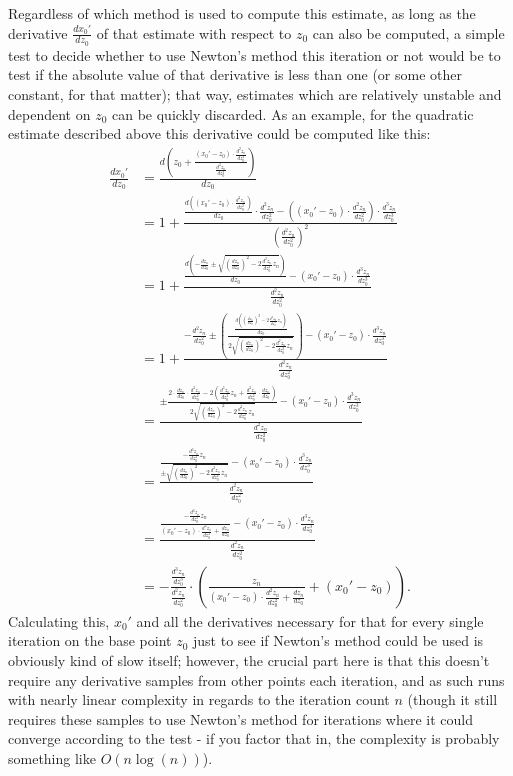 \documentclass[12pt,a4paper]{article}
\newcommand{\eqar}[1]{\begin{align*} #1 \end{align*}}
\begin{document}
Regardless of which method is used to compute this estimate, as long as the derivative $\frac{dx_0'}{dz_0}$ of that estimate with respect to $z_0$ can also be computed, a simple test to decide whether to use Newton's method this iteration or not would be to test if the absolute value of that derivative is less than one (or some other constant, for that matter); that way, estimates which are relatively unstable and dependent on $z_0$ can be quickly discarded. As an example, for the quadratic estimate described above this derivative could be computed like this:
\eqar{
	\frac{dx_0'}{dz_0} &= \frac{d\left(z_0+\frac{(x_0'-z_0)\cdot\frac{d^2z_n}{dz_0^2}}{\frac{d^2z_n}{dz_0^2}}\right)}{dz_0}\\
	&= 1+\frac{\frac{d\left((x_0'-z_0)\cdot\frac{d^2z_n}{dz_0^2}\right)}{dz_0}\cdot\frac{d^2z_n}{dz_0^2}-((x_0'-z_0)\cdot\frac{d^2z_n}{dz_0^2})\cdot\frac{d^3z_n}{dz_0^3}}{(\frac{d^2z_n}{dz_0^2})^2}\\
	&= 1+\frac{\frac{d\left(-\frac{dz_n}{dz_0}\pm\sqrt{(\frac{dz_n}{dz_0})^2-2\frac{d^2z_n}{dz_0^2}z_n}\right)}{dz_0}-(x_0'-z_0)\cdot\frac{d^3z_n}{dz_0^3}}{\frac{d^2z_n}{dz_0^2}}\\
	&= 1+\frac{-\frac{d^2z_n}{dz_0^2}\pm\left(\frac{\frac{d((\frac{dz_n}{dz_0})^2-2\frac{d^2z_n}{dz_0^2}z_n)}{dz_0}}{2\sqrt{(\frac{dz_n}{dz_0})^2-2\frac{d^2z_n}{dz_0^2}z_n}}\right)-(x_0'-z_0)\cdot\frac{d^3z_n}{dz_0^3}}{\frac{d^2z_n}{dz_0^2}}\\
	&= \frac{\pm\frac{2\cdot\frac{dz_n}{dz_0}\cdot\frac{d^2z_n}{dz_0^2}-2(\frac{d^3z_n}{dz_0^3}z_n+\frac{d^2z_n}{dz_0^2}\cdot\frac{dz_n}{dz_0})}{2\sqrt{(\frac{dz_n}{dz_0})^2-2\frac{d^2z_n}{dz_0^2}z_n}}-(x_0'-z_0)\cdot\frac{d^3z_n}{dz_0^3}}{\frac{d^2z_n}{dz_0^2}}\\
	&= \frac{\frac{-\frac{d^3z_n}{dz_0^3}z_n}{\pm\sqrt{(\frac{dz_n}{dz_0})^2-2\frac{d^2z_n}{dz_0^2}z_n}}-(x_0'-z_0)\cdot\frac{d^3z_n}{dz_0^3}}{\frac{d^2z_n}{dz_0^2}}\\
	&= \frac{\frac{-\frac{d^3z_n}{dz_0^3}z_n}{(x_0'-z_0)\cdot\frac{d^2z_n}{dz_0^2}+\frac{dz_n}{dz_0}}-(x_0'-z_0)\cdot\frac{d^3z_n}{dz_0^3}}{\frac{d^2z_n}{dz_0^2}}\\
	&= -\frac{\frac{d^3z_n}{dz_0^3}}{\frac{d^2z_n}{dz_0^2}}\cdot\left(\frac{z_n}{(x_0'-z_0)\cdot\frac{d^2z_n}{dz_0^2}+\frac{dz_n}{dz_0}}+(x_0'-z_0)\right).
}
Calculating this, $x_0'$ and all the derivatives necessary for that for every single iteration on the base point $z_0$ just to see if Newton's method could be used is obviously kind of slow itself; however, the crucial part here is that this doesn't require any derivative samples from other points each iteration, and as such runs with nearly linear complexity in regards to the iteration count $n$ (though it still requires these samples to use Newton's method for iterations where it could converge according to the test - if you factor that in, the complexity is probably something like $O(n\log(n))$).
\end{document}
